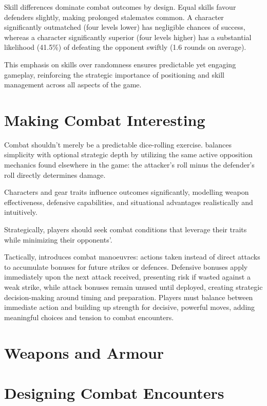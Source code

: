 
Skill differences dominate combat outcomes by design. Equal skills favour defenders slightly, making prolonged stalemates common. A character significantly outmatched (four levels lower) has negligible chances of success, whereas a character significantly superior (four levels higher) has a substantial likelihood (41.5\%) of defeating the opponent swiftly (1.6 rounds on average).

This emphasis on skills over randomness ensures predictable yet engaging gameplay, reinforcing the strategic importance of positioning and skill management across all aspects of the game.

\section{Making Combat Interesting}

Combat shouldn’t merely be a predictable dice-rolling exercise. \wyrd balances simplicity with optional strategic depth by utilizing the same active opposition mechanics found elsewhere in the game: the attacker’s roll minus the defender’s roll directly determines damage.

Characters and gear traits influence outcomes significantly, modelling weapon effectiveness, defensive capabilities, and situational advantages realistically and intuitively.

Strategically, players should seek combat conditions that leverage their traits while minimizing their opponents’.

Tactically, \wyrd introduces combat manoeuvres: actions taken instead of direct attacks to accumulate bonuses for future strikes or defences. Defensive bonuses apply immediately upon the next attack received, presenting risk if wasted against a weak strike, while attack bonuses remain unused until deployed, creating strategic decision-making around timing and preparation. Players must balance between immediate action and building up strength for decisive, powerful moves, adding meaningful choices and tension to combat encounters.



\section{Weapons and Armour}


\section{Designing Combat Encounters}




